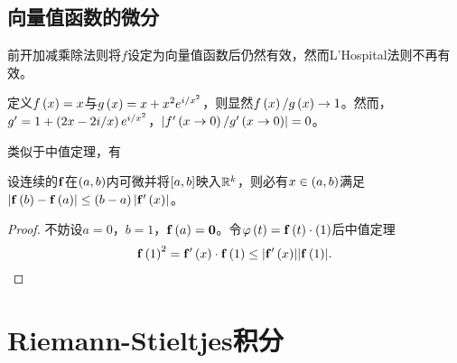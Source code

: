 \documentclass{ctexrep}
\begin{document}
  \subsection{向量值函数的微分}
  前开加减乘除法则将$f$设定为向量值函数后仍然有效，然而L'Hospital法则不再有效。
  \begin{ex}
    定义$f\left(x\right)=x$与$g\left(x\right)=x+x^2 e^{i/x^2}$，则显然$f\left(x\right)/g\left(x\right)\rightarrow1$。然而，$g'=1+\left(2x-2i/x\right)e^{i/x^2}$，$\abs{f'\left(x\rightarrow0\right)/g'\left(x\rightarrow0\right)}=0$。
  \end{ex}
  类似于中值定理，有
  \begin{theorem}
    \label{thm:vfab}
    设连续的$\mathbf{f}$在$\left(a,b\right)$内可微并将$\left[a,b\right]$映入$\mathbb{R}^k$，则必有$x\in\left(a,b\right)$满足$\abs{\mathbf{f}\left(b\right)-\mathbf{f}\left(a\right)}\le\left(b-a\right)\abs{\mathbf{f}'\left(x\right)}$。
  \end{theorem}
  \begin{proof}
    不妨设$a=0$，$b=1$，$\mathbf{f}\left(a\right)=\boldsymbol{0}$。令$\varphi\left(t\right)=\mathbf{f}\left(t\right)\cdot\left(1\right)$后中值定理
    \[ \mathbf{f}\left(1\right)^2 = \mathbf{f}'\left(x\right)\cdot \mathbf{f}\left(1\right) \le \abs{\mathbf{f}'\left(x\right)}\abs{\mathbf{f}\left(1\right)}. \qedhere \]
  \end{proof}
  \section{Riemann-Stieltjes积分}
\end{document}
